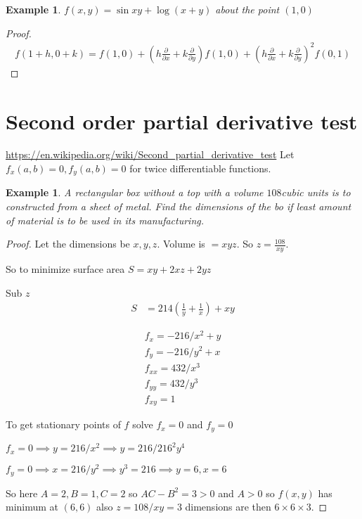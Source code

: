 \documentclass[oneside,11pt,pdftex]{book}%
\numberwithin{equation}{section}
\newtheorem{example}[theorem]{Example}
\numberwithin{section}{chapter}
\numberwithin{equation}{chapter}
\begin{document}
\begin{example}
	$ f(x,y) = \sin xy + \log (x+y)$ about the point $ (1,0) $
\end{example}
\begin{proof}
	\begin{align*}
		f(1+h,0+k)=f(1,0)+\left(h \frac{\partial }{\partial x}+k \frac{\partial }{\partial y}\right) f(1,0)+ \left(h \frac{\partial }{\partial x}+k \frac{\partial }{\partial y}\right)^2 f(0,1)
	\end{align*}
\end{proof}

\section{Second order partial derivative test}
\url{https://en.wikipedia.org/wiki/Second_partial_derivative_test}
Let $ f_x(a,b) =0, f_y(a,b)=0$ for twice differentiable functions.

\begin{example}
	A rectangular box without a top with a volume $ 108 $cubic units is to constructed from a sheet of metal. Find the dimensions of the bo if least amount of material is to be used in its manufacturing.
\end{example}
\begin{proof}
	Let the dimensions be $ x,y,z $.
	Volume is $ =xyz $. So $ z=\frac{108}{xy} $.
	
	So to minimize surface area $S= xy+2xz+2yz $
	
	Sub $ z $
	\begin{align*}
		S&=214\left(\frac{1}{y}+\frac{1}{x}\right)+xy
	\end{align*}
	
	\begin{align*}
		f_x=-216/x^2+y\\
		f_y=-216/y^2+x\\
		f_{xx}=432/x^3\\
		f_{yy}=432/y^3\\
		f_{xy}=1
	\end{align*}

	To get stationary points of $ f $ solve  $ f_x=0 $ and $ f_y=0 $
	
	$ f_x=0 \implies y=216/x^2 \implies y=216/216^2 y^4 $
	
	$ f_y=0\implies x=216/y^2 \implies y^3=216 \implies y=6, x=6$
	
	So here $ A=2,B=1,C=2 $ so $ AC-B^2=3>0 $ and $ A>0 $ so $ f(x,y) $ has minimum at $ (6,6) $ also $ z=108/xy=3 $ dimensions are then $ 6\times 6 \times 3 $.
\end{proof}
\end{document}
